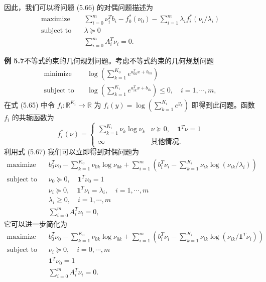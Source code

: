 \documentclass[UTF8, 12pt, fontset=fandol, oneside]{ctexart}
\begin{document}
因此，我们可以将问题 (5.66) 的对偶问题描述为
\begin{equation}
\begin{aligned}
\text{maximize}\quad & \sum_{i=0}^m\nu_i^Tb_i-f_0^\ast(\nu_0)-\sum_{i=1}^m\lambda_i f_i^\ast(\nu_i/\lambda_i)\\
\text{subject to}\quad & \lambda\succeq 0\\
& \sum_{i=0}^m A_i^T\nu_i=0.
\end{aligned}
\tag{5.67}
\end{equation}

\noindent\textbf{例 5.7}\quad 不等式约束的几何规划问题。考虑不等式约束的几何规划问题
\[
\begin{aligned}
\text{minimize}\quad & \log\left(\sum_{k=1}^{K_0}e^{a_{0k}^Tx+b_{0k}}\right)\\
\text{subject to}\quad & \log\left(\sum_{k=1}^{K_i}e^{a_{ik}^Tx+b_{ik}}\right)\leq 0,\quad i=1,\cdots,m,
\end{aligned}
\]
在式 (5.65) 中令 $f_i:\mathbb{R}^{K_i}\to\mathbb{R}$ 为 $f_i(y)=\log\left(\sum_{k=1}^{K_i}e^{y_k}\right)$ 即得到此问题。函数 $f_i$ 的共轭函数为
\[
f_i^\ast(\nu)=
\begin{cases}
\sum_{k=1}^{K_i}\nu_k\log\nu_k & \nu\succeq 0,\quad \mathbf{1}^T\nu=1\\
\infty & \text{其他情况}.
\end{cases}
\]
利用式 (5.67) 我们可以立即得到对偶问题为
\[
\begin{aligned}
\text{maximize}\quad & b_0^T\nu_0-\sum_{k=1}^{K_0}\nu_{0k}\log\nu_{0k}
+\sum_{i=1}^m\left(b_i^T\nu_i-\sum_{k=1}^{K_i}\nu_{ik}\log(\nu_{ik}/\lambda_i)\right)\\
\text{subject to}\quad & \nu_0\succeq 0,\quad \mathbf{1}^T\nu_0=1\\
& \nu_i\succeq 0,\quad \mathbf{1}^T\nu_i=\lambda_i,\quad i=1,\cdots,m\\
& \lambda_i\geq 0,\quad i=1,\cdots,m\\
& \sum_{i=0}^m A_i^T\nu_i=0,
\end{aligned}
\]
它可以进一步简化为
\[
\begin{aligned}
\text{maximize}\quad & b_0^T\nu_0-\sum_{k=1}^{K_0}\nu_{0k}\log\nu_{0k}
+\sum_{i=1}^m\left(b_i^T\nu_i-\sum_{k=1}^{K_i}\nu_{ik}\log(\nu_{ik}/\mathbf{1}^T\nu_i)\right)\\
\text{subject to}\quad & \nu_i\succeq 0,\quad i=0,\cdots,m\\
& \mathbf{1}^T\nu_0=1\\
& \sum_{i=0}^m A_i^T\nu_i=0.
\end{aligned}
\]
\end{document}
